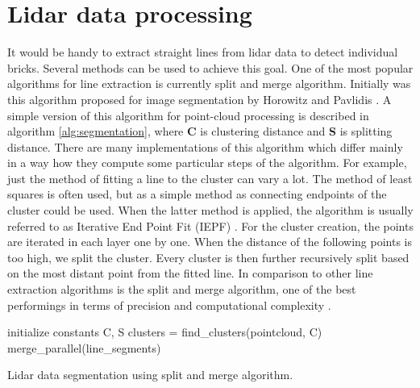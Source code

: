 \section{Lidar data processing}

It would be handy to extract straight lines from lidar data to detect individual bricks. Several methods can be used to achieve this goal. One of the most popular algorithms for line extraction is currently split and merge algorithm. Initially was this algorithm proposed for image segmentation by Horowitz and Pavlidis \cite{horowitz1974}. A simple version of this algorithm for point-cloud processing is described in algorithm \ref{alg:segmentation}, where \textbf{C} is clustering distance and \textbf{S} is splitting distance. There are many implementations of this algorithm which differ mainly in a way how they compute some particular steps of the algorithm. For example, just the method of fitting a line to the cluster can vary a lot. The method of least squares is often used, but as a simple method as connecting endpoints of the cluster could be used. When the latter method is applied, the algorithm is usually referred to as Iterative End Point Fit (IEPF) \cite{siadat1997}. For the cluster creation, the points are iterated in each layer one by one. When the distance of the following points is too high, we split the cluster. Every cluster is then further recursively split based on the most distant point from the fitted line. In comparison to other line extraction algorithms is the split and merge algorithm, one of the best performings in terms of precision and computational complexity \cite{nguyen2006}.
\begin{algorithm}[]
initialize constants C, S\;
  clusters = find\_clusters(pointcloud, C)\;
merge\_parallel(line\_segments)\;
 
 \caption{Lidar data segmentation using split and merge algorithm.}
 \label{alg:segmentation}
\end{algorithm}


